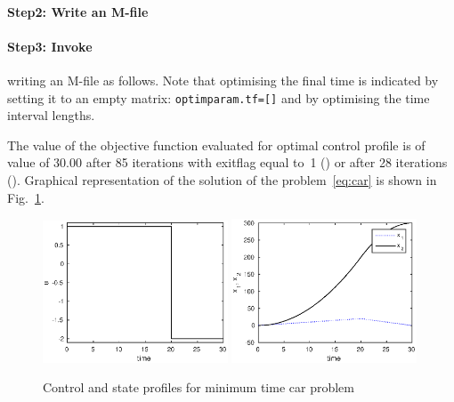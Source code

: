 {\small }

\paragraph{Step2: Write an M-file~}

{\small }

\paragraph{Step3: Invoke~} writing an M-file
 as follows. Note that optimising the final time is
indicated by setting it to an empty matrix: \verb+optimparam.tf=[]+
and by optimising the time interval lengths. 

{\small }

The value of the objective function evaluated for optimal control
profile is of value of 30.00 after 85 iterations with exitflag equal
to~1 () or after 28 iterations (). Graphical
representation of the solution of the problem~\eqref{eq:car} is shown
in Fig.~\ref{fig:car}.

\begin{figure}[htb]
\includegraphics[width=0.49\textwidth]{examples/problem-car/car_u.eps}
\includegraphics[width=0.49\textwidth]{examples/problem-car/car_x.eps}
\caption{Control and state profiles for minimum time car
  problem} \label{fig:car}
\end{figure}

